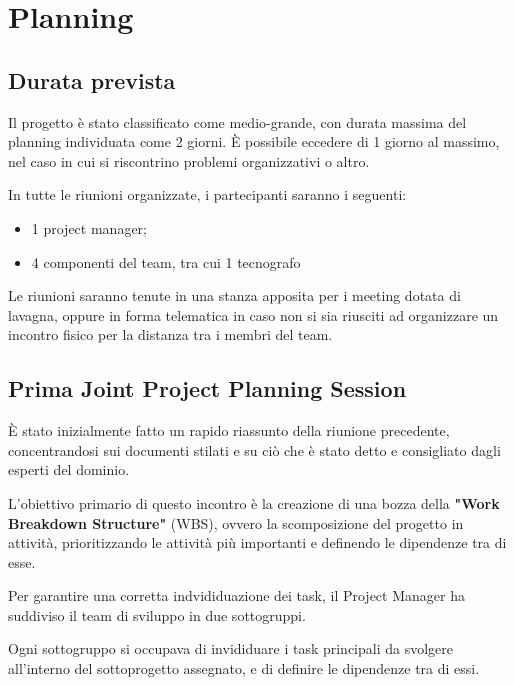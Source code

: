 \section{Planning}


\subsection{Durata prevista}
Il progetto è stato classificato come medio-grande, con durata massima del planning individuata come 2 giorni.
È possibile eccedere di 1 giorno al massimo, nel caso in cui si riscontrino problemi organizzativi o altro.

In tutte le riunioni organizzate, i partecipanti saranno i seguenti:
\begin{itemize}
    \item 1 project manager;
    \item 4 componenti del team, tra cui 1 tecnografo
\end{itemize}

Le riunioni saranno tenute in una stanza apposita per i meeting dotata di lavagna, oppure in forma
telematica in caso non si sia riusciti ad organizzare un incontro fisico per la distanza tra i membri del team.

\subsection{Prima Joint Project Planning Session}
È stato inizialmente fatto un rapido riassunto della riunione precedente, concentrandosi sui documenti stilati e su ciò che
è stato detto e consigliato dagli esperti del dominio.

L'obiettivo primario di questo incontro è la creazione di una bozza della \textbf{"Work Breakdown Structure"} (WBS), ovvero la scomposizione
del progetto in attività, prioritizzando le attività più importanti e definendo le dipendenze tra di esse.

Per garantire una corretta indvididuazione dei task, il Project Manager ha suddiviso il team di sviluppo in due sottogruppi.

Ogni sottogruppo si occupava di invididuare i task principali da svolgere all'interno del sottoprogetto assegnato, e di
definire le dipendenze tra di essi.

